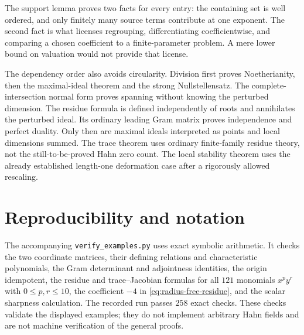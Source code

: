 \documentclass[11pt,letterpaper]{article}
\theoremstyle{definition}
\theoremstyle{remark}
\numberwithin{equation}{section}
\begin{document}
The support lemma proves two facts for every entry: the containing set is well ordered, and only finitely many source terms contribute at one exponent. The second fact is what licenses regrouping, differentiating coefficientwise, and comparing a chosen coefficient to a finite-parameter problem. A mere lower bound on valuation would not provide that license.

The dependency order also avoids circularity. Division first proves Noetherianity, then the maximal-ideal theorem and the strong Nullstellensatz. The complete-intersection normal form proves spanning without knowing the perturbed dimension. The residue formula is defined independently of roots and annihilates the perturbed ideal. Its ordinary leading Gram matrix proves independence and perfect duality. Only then are maximal ideals interpreted as points and local dimensions summed. The trace theorem uses ordinary finite-family residue theory, not the still-to-be-proved Hahn zero count. The local stability theorem uses the already established length-one deformation case after a rigorously allowed rescaling.

\section{Reproducibility and notation}
The accompanying \texttt{verify\_examples.py} uses exact symbolic arithmetic. It checks the two coordinate matrices, their defining relations and characteristic polynomials, the Gram determinant and adjointness identities, the origin idempotent, the residue and trace--Jacobian formulas for all $121$ monomials $x^py^r$ with $0\le p,r\le10$, the coefficient $-4$ in \eqref{eq:radius-free-residue}, and the scalar sharpness calculation. The recorded run passes $258$ exact checks. These checks validate the displayed examples; they do not implement arbitrary Hahn fields and are not machine verification of the general proofs.
\end{document}
